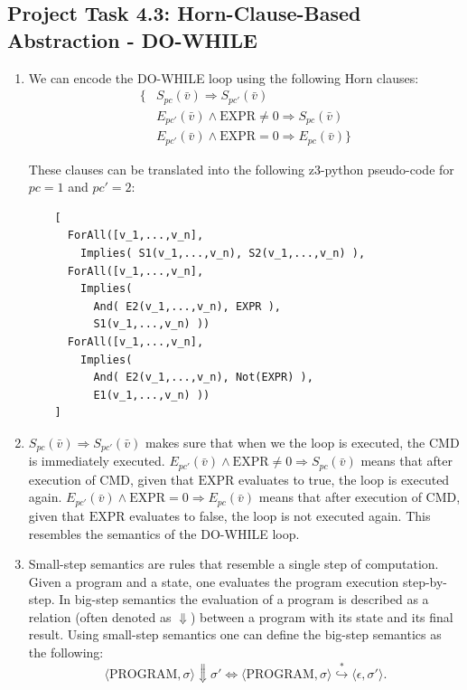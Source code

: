 \documentclass[12pt,a4paper]{article}
\begin{document}
\subsection*{Project Task 4.3: Horn-Clause-Based Abstraction - DO-WHILE}
\begin{enumerate}
    \item We can encode the DO-WHILE loop using the following Horn clauses:
    \begin{align*}
        \{&S_{pc}(\bar v) \Rightarrow S_{pc'}(\bar v) \\
        &E_{pc'}(\bar v)\land \mathrm{EXPR}\neq 0 \Rightarrow S_{pc}(\bar v) \\
        &E_{pc'}(\bar v)\land \mathrm{EXPR} = 0 \Rightarrow E_{pc}(\bar v)\}
    \end{align*}

    These clauses can be translated into the following z3-python pseudo-code for $pc=1$ and $pc'=2$:
    \begin{verbatim}
    [
      ForAll([v_1,...,v_n],
        Implies( S1(v_1,...,v_n), S2(v_1,...,v_n) ),
      ForAll([v_1,...,v_n],
        Implies(
          And( E2(v_1,...,v_n), EXPR ),
          S1(v_1,...,v_n) ))
      ForAll([v_1,...,v_n],
        Implies(
          And( E2(v_1,...,v_n), Not(EXPR) ),
          E1(v_1,...,v_n) ))
    ]
    \end{verbatim}

    \item $S_{pc}(\bar v) \Rightarrow S_{pc'}(\bar v)$ makes sure that when we the loop is executed, the $\mathrm{CMD}$ is immediately executed. $E_{pc'}(\bar v)\land \mathrm{EXPR}\neq 0 \Rightarrow S_{pc}(\bar v)$ means that after execution of $\mathrm{CMD}$, given that $\mathrm{EXPR}$ evaluates to true, the loop is executed again. $E_{pc'}(\bar v)\land \mathrm{EXPR} = 0 \Rightarrow E_{pc}(\bar v)$ means that after execution of $\mathrm{CMD}$, given that $\mathrm{EXPR}$ evaluates to false, the loop is not executed again. This resembles the semantics of the DO-WHILE loop.

    \item Small-step semantics are rules that resemble a single step of computation. Given a program and a state, one evaluates the program execution step-by-step. In big-step semantics the evaluation of a program is described as a relation (often denoted as $\Downarrow$) between a program with its state and its final result. Using small-step semantics one can define the big-step semantics as the following: \[\langle \textrm{PROGRAM},\sigma\rangle \Downarrow \sigma' \Leftrightarrow \langle\textrm{PROGRAM},\sigma\rangle \overset{*}{\hookrightarrow} \langle\epsilon,\sigma'\rangle.\] 


\end{enumerate}
\end{document}
